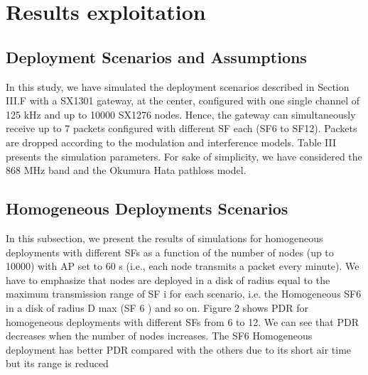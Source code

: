\section{Results exploitation} \label{sec:Results exploitation}


\subsection{Deployment Scenarios and Assumptions}
In this study,
	we have simulated the deployment scenarios described in Section III.F with a SX1301 gateway,
	at the center,
	configured with one single channel of 125 kHz and up to 10000 SX1276 nodes.
Hence,
	the gateway can simultaneously receive up to 7 packets configured with different SF each (SF6 to SF12).
Packets are dropped according to the modulation and interference models.
Table III presents the simulation parameters.
For sake of simplicity,
	we have considered the 868 MHz band and the Okumura Hata pathloss model.
	
\subsection{Homogeneous Deployments Scenarios}

In this subsection,
	we present the results of simulations for homogeneous deployments with different SFs as a function of the number of nodes (up to 10000) with AP set to 60 s (i.e.,
	each node transmits a packet every minute).
We have to emphasize that nodes are deployed in a disk of radius equal to the maximum transmission range of SF i for each scenario,
	i.e.
the Homogeneous SF6 in a disk of radius D max (SF 6 ) and so on.
Figure 2 shows PDR for homogeneous deployments with different SFs from 6 to 12.
We can see that PDR decreases when the number of nodes increases.
The SF6 Homogeneous deployment has better PDR compared with the others due to its short air time but its range is reduced


